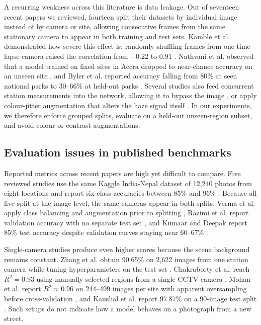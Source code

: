 \documentclass[conference]{IEEEtran}
\begin{document}
A recurring weakness across this literature is data leakage. Out of seventeen
recent papers we reviewed, fourteen split their datasets by individual image
instead of by camera or site, allowing consecutive frames from the same
stationary camera to appear in both training and test sets. Kamble et al.
demonstrated how severe this effect is: randomly shuffling frames from one
time-lapse camera raised the correlation from $-0.22$ to $0.91$
\cite{kambleMobileImageDrivenPM252025}. Nathvani et al. observed that a model
trained on fixed sites in Accra dropped to near-chance accuracy on an unseen
site \cite{nathvaniHereNowEvaluating2023}, and Byler et al. reported accuracy
falling from 80\% at seen national parks to 30--66\% at held-out parks
\cite{bylerLocationGeneralizabilityImageBased2025}. Several studies also feed
concurrent station measurements into the network, allowing it to bypass the
image \cite{abdelsalamSkyFuseNetCrossAttentionSwin2026}, or apply colour-jitter
augmentation that alters the haze signal itself
\cite{bylerLocationGeneralizabilityImageBased2025}. In our experiments, we
therefore enforce grouped splits, evaluate on a held-out unseen-region subset,
and avoid colour or contrast augmentations.

\subsection{Evaluation issues in published benchmarks}
Reported metrics across recent papers are high yet difficult to compare. Five
reviewed studies use the same Kaggle India-Nepal dataset of 12,240 photos from
eight locations and report six-class accuracies between 85\% and 96\%
\cite{dohaDeepMultiTaskLearning2026,abdelsalamSkyFuseNetCrossAttentionSwin2026,kumaar.bImageBasedAir2025,vermaImagebasedAirPollution2025,razimiIntegratingDeepLearning2024a}.
Because all five split at the image level, the same cameras appear in both
splits. Verma et al. apply class balancing and augmentation prior to splitting
\cite{vermaImagebasedAirPollution2025}, Razimi et al. report validation accuracy
with no separate test set \cite{razimiIntegratingDeepLearning2024a}, and Kumaar
and Deepak report 85\% test accuracy despite validation curves staying near
60--67\% \cite{kumaar.bImageBasedAir2025}.

Single-camera studies produce even higher scores because the scene background
remains constant. Zhang et al. obtain 90.65\% on 2,622 images from one station
camera while tuning hyperparameters on the test set
\cite{zhangAirQualityLevel2024}. Chakraborty et al. reach $R^2=0.93$ using
manually selected regions from a single CCTV camera
\cite{chakrabortyCanImageTell2024}, Mohan et al. report $R^2\approx0.96$ on
244--499 images per site with apparent oversampling before cross-validation
\cite{mohanDeepLearningBasedPM252025}, and Kaushal et al. report 97.87\% on a
90-image test split \cite{kaushalEvaluationDeepLearning2024}. Such setups do not
indicate how a model behaves on a photograph from a new street.
\end{document}
